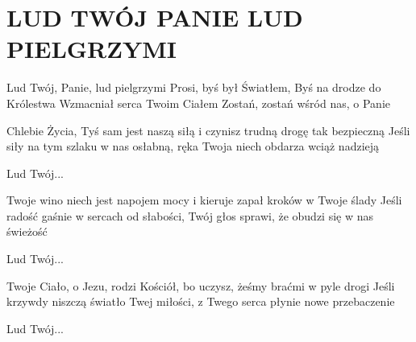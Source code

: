 \documentclass[../../../songbook.tex]{subfiles}
\begin{document}
\TabPositions{8cm} %
\section*{LUD TWÓJ PANIE LUD PIELGRZYMI}
{}
\vspace{0.5cm}
\-\hspace{1cm} Lud Twój, Panie, lud pielgrzymi		 \newline	
\-\hspace{1cm} Prosi, byś był Światłem,				\newline
\-\hspace{1cm} Byś na drodze do Królestwa			\newline
\-\hspace{1cm} Wzmacniał serca Twoim Ciałem			\newline
\-\hspace{1cm} Zostań, zostań wśród nas, o Panie	\newline

Chlebie Życia, Tyś sam jest naszą siłą		\newline
i czynisz trudną drogę tak bezpieczną		\newline
Jeśli siły na tym szlaku w nas osłabną,		\newline
ręka Twoja niech obdarza wciąż nadzieją		\newline

\-\hspace{1cm} Lud Twój... \newline	

Twoje wino niech jest napojem mocy \newline	
i kieruje zapał kroków w Twoje ślady \newline	
Jeśli radość gaśnie w sercach od słabości, \newline	
Twój głos sprawi, że obudzi się w nas świeżość \newline	

\-\hspace{1cm} Lud Twój... \newline	

Twoje Ciało, o Jezu, rodzi Kościół, \newline	
bo uczysz, żeśmy braćmi w pyle drogi \newline	
Jeśli krzywdy niszczą światło Twej miłości, \newline	
z Twego serca płynie nowe przebaczenie \newline	

\-\hspace{1cm} Lud Twój... \newline	
\end{document}
